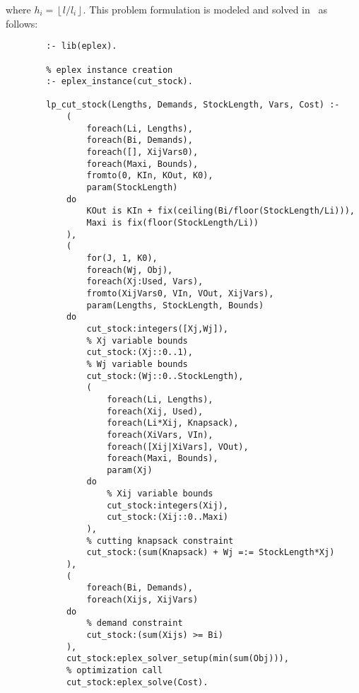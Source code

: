 where $h_{i}=\left\lfloor l/l_{i}\right\rfloor$. This problem formulation is modeled and solved in \eclipse\  as follows:
\begin{verbatim}
        :- lib(eplex).

        % eplex instance creation
        :- eplex_instance(cut_stock).

        lp_cut_stock(Lengths, Demands, StockLength, Vars, Cost) :-
            (
                foreach(Li, Lengths),
                foreach(Bi, Demands),
                foreach([], XijVars0),
                foreach(Maxi, Bounds),
                fromto(0, KIn, KOut, K0),
                param(StockLength)
            do
                KOut is KIn + fix(ceiling(Bi/floor(StockLength/Li))),
                Maxi is fix(floor(StockLength/Li))
            ),
            (
                for(J, 1, K0),
                foreach(Wj, Obj),
                foreach(Xj:Used, Vars),
                fromto(XijVars0, VIn, VOut, XijVars),
                param(Lengths, StockLength, Bounds)
            do
                cut_stock:integers([Xj,Wj]),
                % Xj variable bounds
                cut_stock:(Xj::0..1),
                % Wj variable bounds
                cut_stock:(Wj::0..StockLength),
                (
                    foreach(Li, Lengths),
                    foreach(Xij, Used),
                    foreach(Li*Xij, Knapsack),
                    foreach(XiVars, VIn),
                    foreach([Xij|XiVars], VOut),
                    foreach(Maxi, Bounds),
                    param(Xj)
                do
                    % Xij variable bounds
                    cut_stock:integers(Xij),
                    cut_stock:(Xij::0..Maxi)
                ),
                % cutting knapsack constraint
                cut_stock:(sum(Knapsack) + Wj =:= StockLength*Xj)
            ),
            (
                foreach(Bi, Demands),
                foreach(Xijs, XijVars)
            do
                % demand constraint
                cut_stock:(sum(Xijs) >= Bi)
            ),
            cut_stock:eplex_solver_setup(min(sum(Obj))),
            % optimization call
            cut_stock:eplex_solve(Cost).
\end{verbatim}
